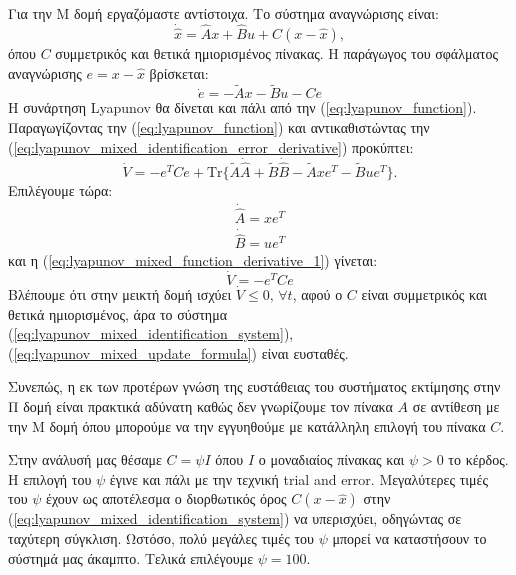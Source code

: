 \documentclass[a4paper,12pt]{article}
\begin{document}
Για την Μ δομή εργαζόμαστε αντίστοιχα. Το σύστημα αναγνώρισης είναι:
\begin{equation}
    \dot{\hat{x}} = \hat{A}x + \hat{B} u + C(x - \hat{x}),
    \label{eq:lyapunov_mixed_identification_system}
\end{equation}
όπου $C$ συμμετρικός και θετικά ημιορισμένος πίνακας. Η παράγωγος του σφάλματος αναγνώρισης $e = x - \hat{x}$ 
βρίσκεται:
\begin{equation}
    \dot{e} = -\tilde{A}x - \tilde{B}u - Ce
    \label{eq:lyapunov_mixed_identification_error_derivative}
\end{equation}
Η συνάρτηση Lyapunov θα δίνεται και πάλι από την 
(\ref{eq:lyapunov_function}). Παραγωγίζοντας την (\ref{eq:lyapunov_function}) και αντικαθιστώντας
την (\ref{eq:lyapunov_mixed_identification_error_derivative}) προκύπτει:
\begin{equation}
    \dot{V} = -e^TCe + \mathrm{Tr}\{\tilde{A}\dot{\hat{A}} + \tilde{B}\dot{\hat{B}} - 
    \tilde{A}xe^T - \tilde{B}ue^T\}.
    \label{eq:lyapunov_mixed_function_derivative_1}  
\end{equation}
Επιλέγουμε τώρα:
\begin{equation}
    \begin{aligned}
        \dot{\hat{A}} = xe^T \\ 
        \dot{\hat{B}} = ue^T
    \end{aligned}
    \label{eq:lyapunov_mixed_update_formula}
\end{equation}
και η (\ref{eq:lyapunov_mixed_function_derivative_1}) γίνεται:
\begin{equation}
    \dot{V} = -e^TCe
    \label{eq:lyapunov_mixed_function_derivative_2}
\end{equation}
Βλέπουμε ότι στην μεικτή δομή ισχύει $\dot{V} \leq 0, \, \forall t$, αφού ο $C$ είναι συμμετρικός και θετικά
ημιορισμένος, άρα το σύστημα (\ref{eq:lyapunov_mixed_identification_system}), 
(\ref{eq:lyapunov_mixed_update_formula}) είναι ευσταθές. 

Συνεπώς, η εκ των προτέρων γνώση της ευστάθειας του συστήματος εκτίμησης στην Π δομή είναι πρακτικά αδύνατη
καθώς δεν γνωρίζουμε τον πίνακα $A$ σε αντίθεση με την Μ δομή όπου μπορούμε να την εγγυηθούμε με κατάλληλη 
επιλογή του πίνακα $C$.

Στην ανάλυσή μας θέσαμε $C = \psi I$ όπου $I$ ο μοναδιαίος πίνακας και $\psi > 0$ το κέρδος. 
Η επιλογή του $\psi$ έγινε και πάλι με την τεχνική 
trial and error. Μεγαλύτερες τιμές του $\psi$ έχουν ως 
αποτέλεσμα ο διορθωτικός όρος $C(x - \hat{x})$ στην (\ref{eq:lyapunov_mixed_identification_system}) να 
υπερισχύει, οδηγώντας σε ταχύτερη σύγκλιση. Ωστόσο, πολύ μεγάλες τιμές του $\psi$ μπορεί να καταστήσουν 
το σύστημά μας άκαμπτο. Τελικά επιλέγουμε $\psi = 100$.
\end{document}
